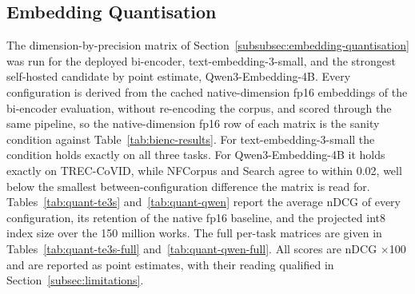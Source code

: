 \subsection{Embedding Quantisation}
\label{sec:results-quant}

The dimension-by-precision matrix of Section~\ref{subsubsec:embedding-quantisation} was run for the deployed bi-encoder, text-embedding-3-small, and the strongest self-hosted candidate by point estimate, Qwen3-Embedding-4B. Every configuration is derived from the cached native-dimension fp16 embeddings of the bi-encoder evaluation, without re-encoding the corpus, and scored through the same pipeline, so the native-dimension fp16 row of each matrix is the sanity condition against Table~\ref{tab:bienc-results}. For text-embedding-3-small the condition holds exactly on all three tasks. For Qwen3-Embedding-4B it holds exactly on TREC-CoVID, while NFCorpus and Search agree to within 0.02, well below the smallest between-configuration difference the matrix is read for.
Tables~\ref{tab:quant-te3s} and~\ref{tab:quant-qwen} report the average nDCG of every configuration, its retention of the native fp16 baseline, and the projected int8 index size over the 150 million works. The full per-task matrices are given in Tables~\ref{tab:quant-te3s-full} and~\ref{tab:quant-qwen-full}. All scores are nDCG $\times$100 and are reported as point estimates, with their reading qualified in Section~\ref{subsec:limitations}.

